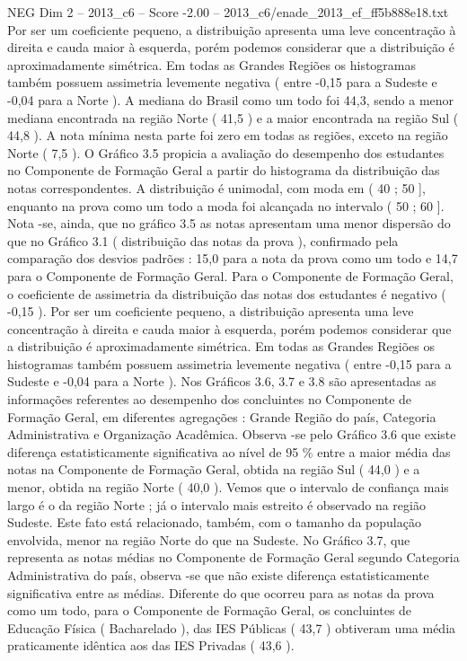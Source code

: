 \begin{textsample}{NEG Dim 2 – 2013\_c6 – Score -2.00 – 2013\_c6/enade\_2013\_ef\_ff5b888e18.txt}
Por ser um coeficiente pequeno, a distribuição apresenta uma leve concentração à direita e cauda maior à esquerda, porém podemos considerar que a distribuição é aproximadamente simétrica.
Em todas as Grandes Regiões os histogramas também possuem assimetria levemente negativa ( entre -0,15 para a Sudeste e -0,04 para a Norte ).
A mediana do Brasil como um todo foi 44,3, sendo a menor mediana encontrada na região Norte ( 41,5 ) e a maior encontrada na região Sul ( 44,8 ).
A nota mínima nesta parte foi zero em todas as regiões, exceto na região Norte ( 7,5 ).
O Gráfico 3.5 propicia a avaliação do desempenho dos estudantes no Componente de Formação Geral a partir do histograma da distribuição das notas correspondentes.
A distribuição é unimodal, com moda em ( 40 ; 50 ], enquanto na prova como um todo a moda foi alcançada no intervalo ( 50 ; 60 ].
Nota -se, ainda, que no gráfico 3.5 as notas apresentam uma menor dispersão do que no Gráfico 3.1 ( distribuição das notas da prova ), confirmado pela comparação dos desvios padrões : 15,0 para a nota da prova como um todo e 14,7 para o Componente de Formação Geral.
Para o Componente de Formação Geral, o coeficiente de assimetria da distribuição das notas dos estudantes é negativo ( -0,15 ).
Por ser um coeficiente pequeno, a distribuição apresenta uma leve concentração à direita e cauda maior à esquerda, porém podemos considerar que a distribuição é aproximadamente simétrica.
Em todas as Grandes Regiões os histogramas também possuem assimetria levemente negativa ( entre -0,15 para a Sudeste e -0,04 para a Norte ).
Nos Gráficos 3.6, 3.7 e 3.8 são apresentadas as informações referentes ao desempenho dos concluintes no Componente de Formação Geral, em diferentes agregações : Grande Região do país, Categoria Administrativa e Organização Acadêmica.
Observa -se pelo Gráfico 3.6 que existe diferença estatisticamente significativa ao nível de 95 \% entre a maior média das notas na Componente de Formação Geral, obtida na região Sul ( 44,0 ) e a menor, obtida na região Norte ( 40,0 ).
Vemos que o intervalo de confiança mais largo é o da região Norte ; já o intervalo mais estreito é observado na região Sudeste.
Este fato está relacionado, também, com o tamanho da população envolvida, menor na região Norte do que na Sudeste.
No Gráfico 3.7, que representa as notas médias no Componente de Formação Geral segundo Categoria Administrativa do país, observa -se que não existe diferença estatisticamente significativa entre as médias.
Diferente do que ocorreu para as notas da prova como um todo, para o Componente de Formação Geral, os concluintes de Educação Física ( Bacharelado ), das IES Públicas ( 43,7 ) obtiveram uma média praticamente idêntica aos das IES Privadas ( 43,6 ).

\end{textsample}

